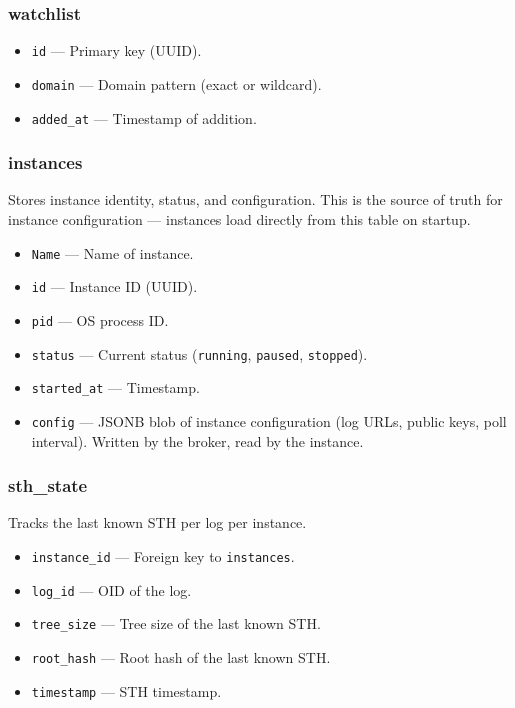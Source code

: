 \documentclass{article}
\begin{document}
\subsubsection{watchlist}
\begin{itemize}
    \item \texttt{id} --- Primary key (UUID).
    \item \texttt{domain} --- Domain pattern (exact or wildcard).
    \item \texttt{added\_at} --- Timestamp of addition.
\end{itemize}

\subsubsection{instances}
Stores instance identity, status, and configuration. This is the source of
truth for instance configuration --- instances load directly from this table
on startup.
\begin{itemize}
    \item \texttt{Name} --- Name of instance.
    \item \texttt{id} --- Instance ID (UUID).
    \item \texttt{pid} --- OS process ID.
    \item \texttt{status} --- Current status (\texttt{running},
    \texttt{paused}, \texttt{stopped}).
    \item \texttt{started\_at} --- Timestamp.
    \item \texttt{config} --- JSONB blob of instance configuration (log
    URLs, public keys, poll interval). Written by the broker, read by
    the instance.
\end{itemize}

\subsubsection{sth\_state}
Tracks the last known STH per log per instance.
\begin{itemize}
    \item \texttt{instance\_id} --- Foreign key to \texttt{instances}.
    \item \texttt{log\_id} --- OID of the log.
    \item \texttt{tree\_size} --- Tree size of the last known STH.
    \item \texttt{root\_hash} --- Root hash of the last known STH.
    \item \texttt{timestamp} --- STH timestamp.
\end{itemize}
\end{document}

